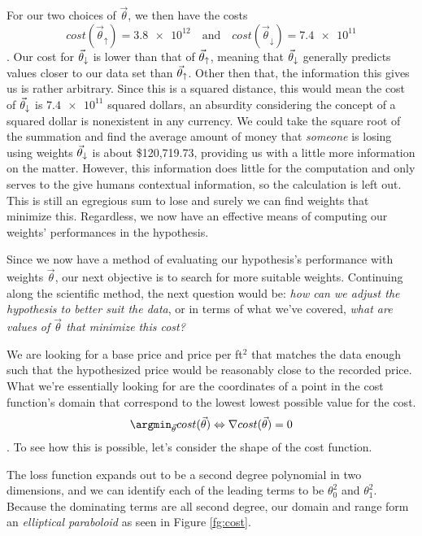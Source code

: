 For our two choices of $\vec\theta$, we then have the costs
\begin{equation}\label{eq:tud cost results}
    cost(\vec\theta_{\uparrow})= \num{3.8e12} \quad \text{and} \quad
    cost(\vec\theta_{\downarrow}) = \num{7.4e11}
\end{equation}
. Our cost for $\vec\theta_{\downarrow}$ is lower than that of $\vec\theta_{\uparrow}$, meaning that $\vec\theta_{\downarrow}$ generally
predicts values closer to our data set than $\vec\theta_{\uparrow}$. Other then that, the
information this gives us is rather arbitrary. Since this is a squared distance,
this would mean the cost of $\vec\theta_{\downarrow}$ is $\num{7.4e11}$ squared dollars, an
absurdity considering the concept of a squared dollar is nonexistent in any
currency.  We could take the square root of the summation and find the average
amount of money that \emph{someone} is losing using weights $\vec\theta_{\downarrow}$ is about
\$120,719.73, providing us with a little more information on the matter.
However, this information does little for the computation and only serves to the
give humans contextual information, so the calculation is left out. This is
still an egregious sum to lose and surely we can find weights that minimize
this. Regardless, we now have an effective means of computing our weights'
performances in the hypothesis.

Since we now have a method of evaluating our hypothesis's performance with
weights $\vec\theta$, our next objective is to search for more suitable weights.
Continuing along the scientific method, the next question would be: \emph{how
can we adjust the hypothesis to better suit the data}, or in terms of what we've
covered, \emph{what are values of $\vec\theta$ that minimize this cost?}

We are looking for a base price and price per ft$^2$ that matches the data
enough such that the hypothesized price would be reasonably close to the
recorded price. What we're essentially looking for are the coordinates of a
point in the cost function's domain that correspond to the lowest lowest
possible value for the cost.
\begin{equation}
    \argmin_{\vec\theta} cost(\vec\theta) \Leftrightarrow \nabla
    cost(\vec\theta) = 0
\end{equation}
. To see how this is possible, let's consider the shape of the cost function.

The loss function expands out to be a second degree polynomial in two
dimensions, and we can identify each of the leading terms to be $\theta_0^2$ and
$\theta_1^2$. Because the dominating terms are all second degree, our domain and
range form an \emph{elliptical paraboloid} as seen in Figure \ref{fg:cost}. 

